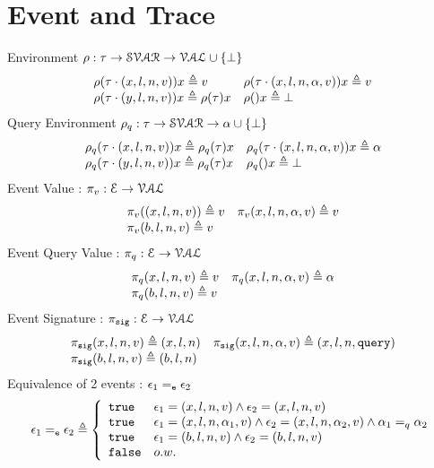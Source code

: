 
%
\section{Event and Trace}
%
%
Environment $ \rho : \mathtt{\tau} \to \mathcal{SVAR} \to \mathcal{VAL} \cup \{\bot\}$
\[
\begin{array}{ll}
\rho(\mathtt{\tau} \cdot (x, l, n, v)) x \triangleq v
&
\rho(\mathtt{\tau} \cdot (x, l, n, \alpha, v)) x \triangleq v
\\
\rho(\mathtt{\tau} \cdot (y, l, n, v)) x \triangleq \rho(\mathtt{\tau}) x
&
\rho() x \triangleq \bot
\end{array}
\]
%
Query Environment $\rho_{q}: \mathtt{\tau} \to \mathcal{SVAR} \to \alpha \cup \{\bot\}$
\[
\begin{array}{ll}
\rho_{q}(\mathtt{\tau} \cdot (x, l, n, v)) x \triangleq \rho_{q}(\mathtt{\tau}) x
&
\rho_{q}(\mathtt{\tau} \cdot (x, l, n, \alpha, v)) x \triangleq \alpha
\\
\rho_{q}(\mathtt{\tau} \cdot (y, l, n, v)) x \triangleq \rho_{q}(\mathtt{\tau}) x
&
\rho_{q}() x \triangleq \bot
\end{array}
\]
%
Event Value : $\pi_v : \mathcal{E} \to \mathcal{VAL}$
\[
\begin{array}{ll}
\pi_v((x, l, n, v)) \triangleq v
&
\pi_v (x, l, n, \alpha, v) \triangleq v
\\
\pi_v (b, l, n, v)  \triangleq v
&
\end{array}
\]
%
Event Query Value : $\pi_{q} : \mathcal{E} \to \mathcal{VAL}$
\[
\begin{array}{ll}
\pi_{q} (x, l, n, v) \triangleq v
&
\pi_{q} (x, l, n, \alpha, v) \triangleq \alpha
\\
\pi_{q} (b, l, n, v)  \triangleq v
&
\end{array}
\]%
% 
Event Signature : $\pi_{\mathtt{sig}} : \mathcal{E} \to \mathcal{VAL}$
\[
\begin{array}{ll}
\pi_{\mathtt{sig}} (x, l, n, v) \triangleq (x, l, n)
&
\pi_{\mathtt{sig}} (x, l, n, \alpha, v) \triangleq (x, l, n, {\tt query})
\\
\pi_{\mathtt{sig}} (b, l, n, v)  \triangleq (b, l, n)
&
\end{array}
\]
%
Equivalence of 2 events : $\mathtt{\epsilon}_1 =_{\mathtt{e}} \mathtt{\epsilon}_2$
\[
\event_1 \eventeq \event_2 \triangleq
\left\{
\begin{array}{ll}
\etrue & \event_1 = (x, l, n, v) \land \event_2 = (x, l, n, v) \\
\etrue & \event_1 = (x, l, n, \qval_1, v) \land \event_2 = (x, l, n, \qval_2, v)  
\land \qval_1 =_{q} \qval_2\\
\etrue & \event_1 = (b, l, n, v) \land \event_2 = (b, l, n, v) \\
\efalse & o.w.
\end{array}
\right.
\]
